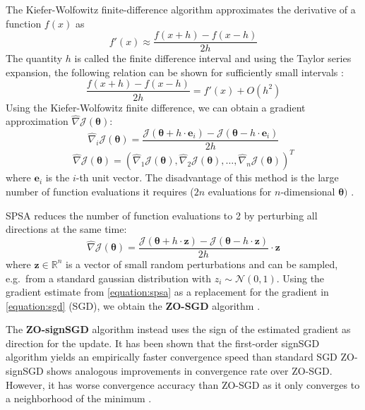 The Kiefer-Wolfowitz finite-difference algorithm
\parencite{KieferWolfowitz} approximates the derivative 
of a function $f(x)$ as
\begin{equation}\label{equation:finitediff}
    f'(x) \approx \frac{f(x+h)-f(x-h)}{2h}
\end{equation}
The quantity $h$ is 
called the finite difference interval and using the 
Taylor series expansion, the following relation 
can be shown for
sufficiently small intervals
\parencite[Page 54]{optimizationbook2}:
\begin{equation}
    \frac{f(x+h)-f(x-h)}{2h} = f'(x) + O(h^2)
\end{equation}
Using the Kiefer-Wolfowitz finite difference, we can obtain 
a gradient approximation $\hat{\nabla}\mathcal{J}(\bm{\theta})$:
\begin{equation}
    \hat{\nabla}_i \mathcal{J}(\bm{\theta}) = \frac{\mathcal{J}(\bm{\theta} + h \cdot \mathbf{e}_i) - \mathcal{J}(\bm{\theta} - h \cdot \mathbf{e}_i)}{2h}
\end{equation} 
\begin{equation}
    \hat{\nabla} \mathcal{J}(\bm{\theta}) = (\hat{\nabla}_1 \mathcal{J}(\bm{\theta}), \hat{\nabla}_2 \mathcal{J}(\bm{\theta}), \dots, \hat{\nabla}_n \mathcal{J}(\bm{\theta}))^T
\end{equation} 
where $\mathbf{e}_i$ is the $i$-th unit vector. The disadvantage of this method is the 
large number of function evaluations it requires 
($2n$ evaluations for $n$-dimensional $\bm{\theta})$
\parencite{finitediffpaper}. 

\ac{SPSA} \parencite{spsa} reduces the number of function
evaluations to 2 by perturbing all directions at the 
same time: 
\begin{equation} \label{equation:spsa}
    \hat{\nabla} \mathcal{J}(\bm{\theta}) = \frac{\mathcal{J}(\bm{\theta} + h\cdot\mathbf{z}) - \mathcal{J}(\bm{\theta} - h\cdot\mathbf{z})}{2h} \cdot \mathbf{z}
\end{equation}
where $\mathbf{z} \in \mathbb{R}^n$ is a vector of small 
random perturbations and can be sampled, e.g.\ 
from a standard gaussian
distribution with $z_i \sim \mathcal{N}(0, 1)$.
Using the gradient estimate from \autoref{equation:spsa}
as a replacement for the gradient in \autoref{equation:sgd}
(\ac{SGD}),
we obtain the \textbf{ZO-SGD} algorithm \parencite{spsa}.

The \textbf{ZO-signSGD} algorithm \parencite{zosignsgd} 
instead uses the sign
of the estimated gradient as direction for the update.
It has been shown that the first-order signSGD 
algorithm \parencite{signsgd}
yields an empirically faster convergence speed than standard 
\ac{SGD} 
ZO-signSGD shows analogous improvements in 
convergence rate over ZO-SGD. However, it has worse 
convergence accuracy than ZO-SGD as it only converges 
to a neighborhood of the minimum \parencite{zoadamm}.

